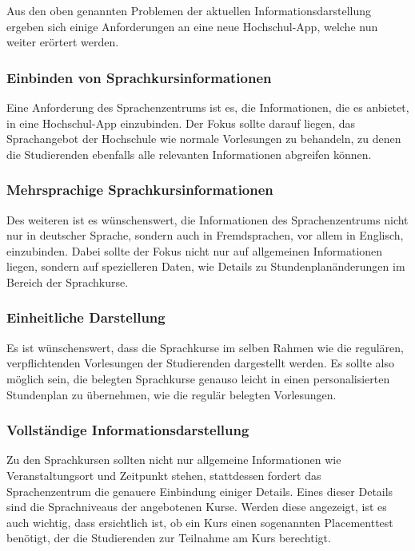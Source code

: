 Aus den oben genannten Problemen der aktuellen Informationsdarstellung ergeben sich einige Anforderungen an eine neue Hochschul-\ac{App}, welche nun weiter erörtert werden.

\subsubsection{Einbinden von Sprachkursinformationen}

Eine Anforderung des Sprachenzentrums ist es, die Informationen, die es anbietet, in eine Hochschul-\ac{App} einzubinden. Der Fokus sollte darauf liegen, das Sprachangebot der Hochschule wie normale Vorlesungen zu behandeln, zu denen die Studierenden ebenfalls alle relevanten Informationen abgreifen können.

\subsubsection{Mehrsprachige Sprachkursinformationen}

Des weiteren ist es wünschenswert, die Informationen des Sprachenzentrums nicht nur in deutscher Sprache, sondern auch in Fremdsprachen, vor allem in Englisch, einzubinden. Dabei sollte der Fokus nicht nur auf allgemeinen Informationen liegen, sondern auf spezielleren Daten, wie Details zu Stundenplanänderungen im Bereich der Sprachkurse. 

\subsubsection{Einheitliche Darstellung}

Es ist wünschenswert, dass die Sprachkurse im selben Rahmen wie die regulären, verpflichtenden Vorlesungen der Studierenden dargestellt werden. Es sollte also möglich sein, die belegten Sprachkurse genauso leicht in einen personalisierten Stundenplan zu übernehmen, wie die regulär belegten Vorlesungen. 

\subsubsection{Vollständige Informationsdarstellung}

Zu den Sprachkursen sollten nicht nur allgemeine Informationen wie Veranstaltungsort und Zeitpunkt stehen, stattdessen fordert das Sprachenzentrum die genauere Einbindung einiger Details. Eines dieser Details sind die Sprachniveaus der angebotenen Kurse. Werden diese angezeigt, ist es auch wichtig, dass ersichtlich ist, ob ein Kurs einen sogenannten Placementtest benötigt, der die Studierenden zur Teilnahme am Kurs berechtigt.
 
